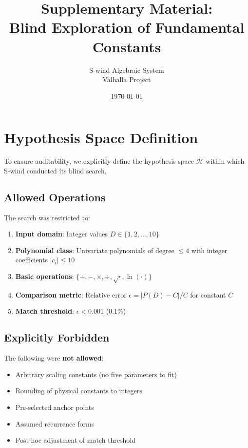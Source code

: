 \documentclass[11pt,a4paper]{article}
\title{Supplementary Material:\\Blind Exploration of Fundamental Constants}
\author{S-wind Algebraic System\\Valhalla Project}
\date{\today}
\begin{document}
\maketitle

\tableofcontents
\newpage

\section{Hypothesis Space Definition}

To ensure auditability, we explicitly define the hypothesis space $\mathcal{H}$ within which S-wind conducted its blind search.

\subsection{Allowed Operations}

The search was restricted to:

\begin{enumerate}
    \item \textbf{Input domain}: Integer values $D \in \{1, 2, \ldots, 10\}$
    \item \textbf{Polynomial class}: Univariate polynomials of degree $\leq 4$ with integer coefficients $|c_i| \leq 10$
    \item \textbf{Basic operations}: $\{+, -, \times, \div, \sqrt{\cdot}, \ln(\cdot)\}$
    \item \textbf{Comparison metric}: Relative error $\epsilon = |P(D) - C| / C$ for constant $C$
    \item \textbf{Match threshold}: $\epsilon < 0.001$ (0.1\%)
\end{enumerate}

\subsection{Explicitly Forbidden}

The following were \textbf{not allowed}:

\begin{itemize}
    \item Arbitrary scaling constants (no free parameters to fit)
    \item Rounding of physical constants to integers
    \item Pre-selected anchor points
    \item Assumed recurrence forms
    \item Post-hoc adjustment of match threshold
\end{itemize}
\end{document}
